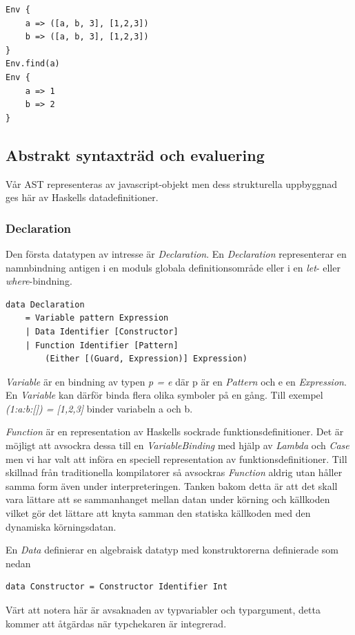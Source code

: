 \begin{lstlisting}
Env {
    a => ([a, b, 3], [1,2,3])
    b => ([a, b, 3], [1,2,3])
}
Env.find(a)
Env {
    a => 1
    b => 2
}
\end{lstlisting}

\subsection{Abstrakt syntaxträd och evaluering} 
Vår AST representeras av javascript-objekt men dess strukturella uppbyggnad ges här av Haskells datadefinitioner.

\subsubsection{Declaration}
Den första datatypen av intresse är \emph{Declaration}. En \emph{Declaration} representerar en namnbindning antigen i en moduls globala definitionsområde eller i en \emph{let}- eller \emph{where}-bindning.

\begin{lstlisting}
data Declaration 
    = Variable pattern Expression
    | Data Identifier [Constructor]
    | Function Identifier [Pattern] 
        (Either [(Guard, Expression)] Expression)
\end{lstlisting}

\emph{Variable} är en bindning av typen \emph{p = e} där p är en \emph{Pattern} och e en \emph{Expression}. En \emph{Variable} kan därför binda flera olika symboler på en gång. Till exempel \emph{(1:a:b:[]) = [1,2,3]} binder variabeln a och b.

\emph{Function} är en representation av Haskells sockrade funktionsdefinitioner. Det är möjligt att avsockra dessa till en \emph{VariableBinding} med hjälp av \emph{Lambda} och \emph{Case} men vi har valt att införa en speciell representation av funktionsdefinitioner. Till skillnad från traditionella kompilatorer så avsockras \emph{Function} aldrig utan håller samma form även under interpreteringen. Tanken bakom detta är att det skall vara lättare att se sammanhanget mellan datan under körning och källkoden vilket gör det lättare att knyta samman den statiska källkoden med den dynamiska körningsdatan.

En \emph{Data} definierar en algebraisk datatyp med konstruktorerna definierade som nedan
\begin{lstlisting}
data Constructor = Constructor Identifier Int
\end{lstlisting}
Värt att notera här är avsaknaden av typvariabler och typargument, detta kommer att åtgärdas när typchekaren är integrerad.

